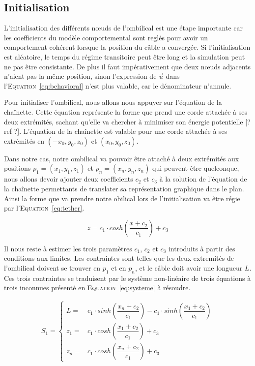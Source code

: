 			
			\subsection{Initialisation}
				L'initialisation des différents n\oe uds de l'ombilical est une étape importante car les coefficients du modèle comportemental sont reglés pour avoir un comportement cohérent lorsque la position du câble a convergée. Si l'initialisation est aléatoire, le temps du régime transitoire peut être long et la simulation peut ne pas être consistante. De plus il faut impérativement que deux n\oe uds adjacents n'aient pas la même position, sinon l'expression de $\overrightarrow{u}$ dans l'\textsc{Equation}~\ref{eq:behavioral} n'est plus valable, car le dénominateur n'annule.
			
				Pour initialiser l'ombilical, nous allons nous appuyer sur l'équation de la chaînette. Cette équation représente la forme que prend une corde attachée à ses deux extrémités, sachant qu'elle va chercher à minimiser son énergie potentielle [? ref ?]. L'équation de la chaînette est valable pour une corde attachée à ses extrémités en $(-x_0, y_0, z_0)$ et $(x_0, y_0, z_0)$.
				
				Dans notre cas, notre ombilical va pouvoir être attaché à deux extrémités aux positions $p_1 = (x_1, y_1, z_1)$ et $p_n = (x_n, y_n, z_n)$ qui peuvent être quelconque, nous allons devoir ajouter deux coefficients $c_2$ et $c_3$ à la solution de l'équation de la chaînette permettants de translater sa représentation graphique dans le plan. Ainsi la forme que va prendre notre obilical lors de l'initialisation va être régie par l'\textsc{Equation}~\ref{eq:tether}.
			
				\begin{equation}
					z = c_1\cdot cosh\left(\frac{x + c_2}{c_1}\right) + c_3
					\label{eq:tether}
				\end{equation}
			
				Il nous reste à estimer les trois paramètres $c_1$, $c_2$ et $c_3$ introduits à partir des conditions aux limites. Les contraintes sont telles que les deux extremités de l'ombilical doivent se trouver en $p_1$ et en $p_n$, et le câble doit avoir une longueur $L$. Ces trois contraintes se traduisent par le système non-linéaire de trois équations à trois inconnues présenté en \textsc{Equation}~\ref{eq:systeme} à résoudre.
				
				\begin{align}
					S_1 = 
					\begin{cases}
						L   = & c_1 \cdot sinh\left(\dfrac{x_n+c_2}{c_1}\right) - c_1 \cdot sinh\left(\dfrac{x_1+c_2}{c_1}\right) \\
						z_1 = & c_1 \cdot cosh\left(\dfrac{x_1+c_2}{c_1}\right)+c_3 \\
						z_n = & c_1 \cdot cosh\left(\dfrac{x_n+c_2}{c_1}\right)+c_3
					\end{cases}
					\label{eq:systeme}
				\end{align}
			
